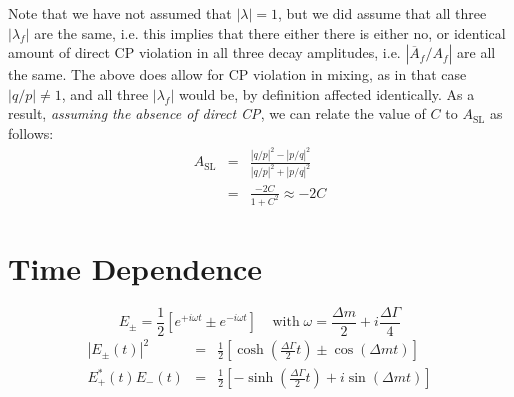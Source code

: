 \documentclass[a4paper,9pt,twoside]{article}
\begin{document}


Note that we have not assumed that $|\lambda|=1$, but we did assume that all three $|\lambda_f|$ are the same, i.e.
this implies that there either there is either no, or identical amount of direct CP violation in all three decay amplitudes,
i.e. $|\overline{A}_f/A_f|$ are all the same. The above does allow for CP violation in mixing, as in that case $|q/p|\ne 1$,
and all three $|\lambda_f|$ would be, by definition affected identically. As a result, {\em assuming the absence of direct CP},
we can relate the value  of $C$ to $A_\mathrm{SL}$ as follows:
\begin{eqnarray}
 A_\mathrm{SL} &=& \frac{ |q/p|^2 - |p/q|^2 }{ |q/p|^2 + |p/q|^2 }  \\
               &=& \frac{ - 2 C } { 1 + C^2 } \approx - 2 C
\end{eqnarray}

\section{Time Dependence}

\begin{equation}
  E_\pm = \frac{1}{2} \left[ e^{+i\omega t } \pm e^{-i\omega t } \right]\;\;\;\;\mathrm{with}\;
   \omega = \frac{\Delta m}{2} + i\frac{\Delta \Gamma}{4} 
\end{equation}
\begin{eqnarray}
 | E_\pm(t) |^2  &=& \frac{1}{2}\left[ \cosh\left(\frac{\Delta\Gamma}{2}t\right) \pm \cos\left(\Delta m t \right) \right] \\
 E_+^*(t)E_-(t)  &=& \frac{1}{2}\left[ -\sinh\left(\frac{\Delta\Gamma}{2}t\right) + i \sin\left(\Delta m t \right) \right]
\end{eqnarray}
\end{document}
